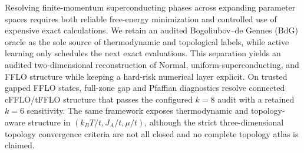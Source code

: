 Resolving finite-momentum superconducting phases across expanding parameter spaces requires both reliable free-energy minimization and controlled use of expensive exact calculations. We retain an audited Bogoliubov--de Gennes (BdG) oracle as the sole source of thermodynamic and topological labels, while active learning only schedules the next exact evaluations. This separation yields an audited two-dimensional reconstruction of Normal, uniform-superconducting, and FFLO structure while keeping a hard-risk numerical layer explicit. On trusted gapped FFLO states, full-zone gap and Pfaffian diagnostics resolve connected cFFLO/tFFLO structure that passes the configured $k=8$ audit with a retained $k=6$ sensitivity. The same framework exposes thermodynamic and topology-aware structure in $(k_BT/t,J_A/t,\mu/t)$, although the strict three-dimensional topology convergence criteria are not all closed and no complete topology atlas is claimed.
